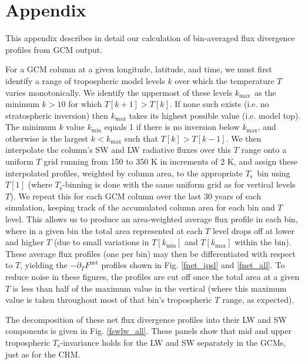 \documentclass[10pt]{article}
\newcommand{\ppt}{\ensuremath{\partial_T}}
\newcommand{\Fnet}{\ensuremath{F^\mathrm{net}}}
\newcommand{\Ts}{\ensuremath{T_\mathrm{s}}}
\newcommand{\kmax}{\ensuremath{k_\mathrm{max}}}
\newcommand{\kmin}{\ensuremath{k_\mathrm{min}}}
\begin{document}
 

\section{Appendix}
This appendix describes in detail our calculation of bin-averaged flux divergence profiles from GCM output.

For a GCM column at a given longitude, latitude, and time, we must first identify a range of tropospheric model levels $k$ over which the temperature $T$ varies monotonically. We identify the uppermost of these levels \kmax\ as the minimum  $k>10$ for which 
$T[k+1]>T[k]$. If none such exists (i.e. no stratospheric inversion) then $\kmax$ takes its highest possible value (i.e. model top).
The minimum $k$ value $\kmin$ equals 1 if there is no inversion below \kmax, and otherwise is the largest $k< \kmax$ such that $T[k]>T[k-1]$. We then interpolate the column's SW and LW radiative fluxes over this $T$ range onto a uniform $T$ grid running from 150 to 350 K in increments of 2 K, and assign these interpolated profiles, weighted by column area,  to the appropriate \Ts\ bin using $T[1]$ (where \Ts-binning is done with the same uniform grid as for vertical levels $T$). We repeat this for each GCM column over the last 30 years of each simulation, keeping track of the accumulated column area for each bin and $T$ level. This allows us to produce an area-weighted average flux profile in each bin, where in a given bin the total area represented at each $T$ level drops off at lower and higher $T$  (due to small variations in $T[\kmin]$ and $T[\kmax]$ within the bin). These average flux profiles (one per bin) may then be differentiated with respect to $T$, yielding the $-\ppt \Fnet$ profiles shown in Fig. \ref{fnet_ipsl} and \ref{fnet_all}. To reduce noise in these figures, the profiles are cut off once the total area at a given $T$ is less than half of the maximum value in the vertical (where this maximum value is taken throughout most of that bin's tropospheric $T$ range, as expected). 

The decomposition of these net flux divergence profiles into their LW and SW components is given in Fig. \ref{fswlw_all}. These panels show that mid and upper tropospheric \Ts-invariance holds for the LW and SW separately in the GCMs, just as for the CRM.




\pagebreak
\end{document}
